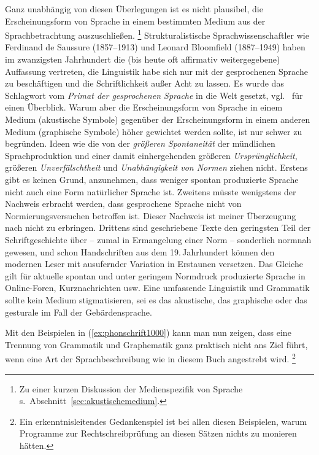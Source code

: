 Ganz unabhängig von diesen Überlegungen ist es nicht plausibel, die Erscheinungsform von Sprache in einem bestimmten Medium aus der Sprachbetrachtung auszuschließen.%
\footnote{Zu einer kurzen Diskussion der Medienspezifik von Sprache s.\ Abschnitt~\ref{sec:akustischemedium}.}
Strukturalistische Sprachwissenschaftler wie Ferdinand de Saussure (1857--1913) und Leonard Bloomfield (1887--1949) haben im zwanzigsten Jahrhundert die (bis heute oft affirmativ weitergegebene) Auffassung vertreten, die Linguistik habe sich nur mit der gesprochenen Sprache zu beschäftigen und die Schriftlichkeit außer Acht zu lassen.
Es wurde das Schlagwort vom \textit{Primat der gesprochenen Sprache} in die Welt gesetzt, vgl.\ \cite[Kapitel~0]{Duerscheid2012a} für einen Überblick.
Warum aber die Erscheinungsform von Sprache in einem Medium (akustische Symbole) gegenüber der Erscheinungsform in einem anderen Medium (graphische Symbole) höher gewichtet werden sollte, ist nur schwer zu begründen.
Ideen wie die von der \textit{größeren Spontaneität} der mündlichen Sprachproduktion und einer damit einhergehenden größeren \textit{Ursprünglichkeit}, größeren \textit{Unverfälschtheit} und \textit{Unabhängigkeit von Normen} ziehen nicht.
Erstens gibt es keinen Grund, anzunehmen, dass weniger spontan produzierte Sprache nicht auch eine Form natürlicher Sprache ist.
Zweitens müsste wenigstens der Nachweis erbracht werden, dass gesprochene Sprache nicht von Normierungsversuchen betroffen ist.
Dieser Nachweis ist meiner Überzeugung nach nicht zu erbringen.
Drittens sind geschriebene Texte den geringsten Teil der Schriftgeschichte über -- zumal in Ermangelung einer Norm -- sonderlich normnah gewesen, und schon Handschriften aus dem 19.\,Jahrhundert können den modernen Leser mit ausufernder Variation in Erstaunen versetzen.
Das Gleiche gilt für aktuelle spontan und unter geringem Normdruck produzierte Sprache in Online-Foren, Kurznachrichten usw.
Eine umfassende Linguistik und Grammatik sollte kein Medium stigmatisieren, sei es das akustische, das graphische oder \zB das gesturale im Fall der Gebärdensprache.


Mit den Beispielen in (\ref{ex:phonschrift1000}) kann man nun zeigen, dass eine Trennung von Grammatik und Graphematik ganz praktisch nicht ans Ziel führt, wenn eine Art der Sprachbeschreibung wie in diesem Buch angestrebt wird.%
\footnote{Ein erkenntnisleitendes Gedankenspiel ist bei allen diesen Beispielen, warum Programme zur Rechtschreibprüfung an diesen Sätzen nichts zu monieren hätten.}


